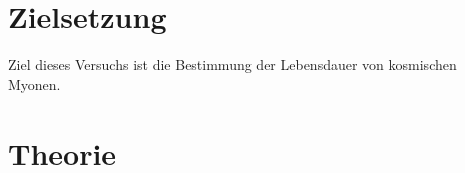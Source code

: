 \section{Zielsetzung}
\label{sec:Zielsetzung}
Ziel dieses Versuchs ist die Bestimmung der Lebensdauer von kosmischen Myonen.


\section{Theorie}
\label{sec:Theorie}


